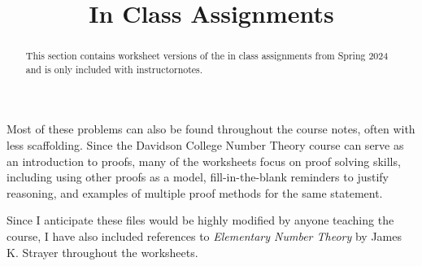 \documentclass[handout]{ximera}
\title{In Class Assignments}
\begin{document}
\begin{abstract}
	This section contains worksheet versions of the in class assignments from Spring 2024 and is only included with instructornotes.
\end{abstract}
 \maketitle
 
Most of these problems can also be found throughout the course notes, often with less scaffolding. Since the Davidson College Number Theory course can serve as an introduction to proofs, many of the worksheets focus on proof solving skills, including using other proofs as a model, fill-in-the-blank reminders to justify reasoning, and examples of multiple proof methods for the same statement.
 
 Since I anticipate these files would be highly modified by anyone teaching the course, I have also included references to \emph{Elementary Number Theory} by James K. Strayer throughout the worksheets.
 
\end{document}
